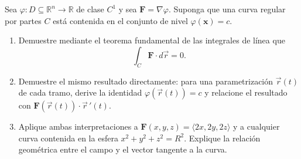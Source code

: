 Sea $\varphi:D\subseteq\mathbb R^n\to\mathbb R$ de clase $C^1$ y sea $\mathbf{F}=\nabla\varphi$. Suponga que una curva regular por partes $C$ está contenida en el conjunto de nivel $\varphi(\mathbf{x})=c$.
\begin{enumerate}
    \item Demuestre mediante el teorema fundamental de las integrales de línea que
    \[
    \int_C\mathbf{F}\cdot d\vec r=0.
    \]
    \item Demuestre el mismo resultado directamente: para una parametrización $\vec r(t)$ de cada tramo, derive la identidad $\varphi(\vec r(t))=c$ y relacione el resultado con $\mathbf{F}(\vec r(t))\cdot\vec r\,'(t)$.
    \item Aplique ambas interpretaciones a $\mathbf{F}(x,y,z)=\langle2x,2y,2z\rangle$ y a cualquier curva contenida en la esfera $x^2+y^2+z^2=R^2$. Explique la relación geométrica entre el campo y el vector tangente a la curva.
\end{enumerate}
